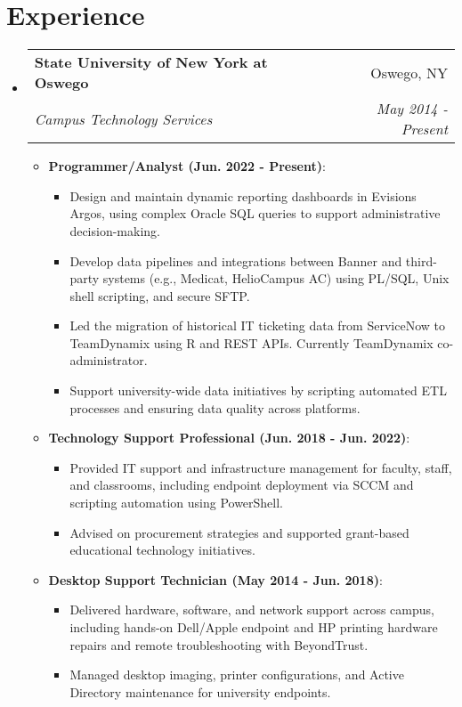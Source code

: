 \documentclass[letterpaper,11pt]{article}
\makeatletter
\newcommand{\resumeItem}[2]{
  \item\small{
    \textbf{#1}{: #2 \vspace{-2pt}}
  }
}
\newcommand{\resumeSubheading}[4]{
  \vspace{-1pt}\item
    \begin{tabular*}{0.97\textwidth}[t]{l@{\extracolsep{\fill}}r}
      \textbf{#1} & #2 \\
      \textit{\small#3} & \textit{\small #4} \\
    \end{tabular*}\vspace{-5pt}
}
\newcommand{\resumeSubHeadingListStart}{\begin{itemize}[leftmargin=*]}
\newcommand{\resumeSubHeadingListEnd}{\end{itemize}}
\newcommand{\resumeItemListStart}{\begin{itemize}}
\newcommand{\resumeItemListEnd}{\end{itemize}\vspace{-5pt}}
\makeatother
\begin{document}
\section{Experience}
  	\resumeSubHeadingListStart
    	\resumeSubheading
      		{State University of New York at Oswego}{Oswego, NY}
      		{Campus Technology Services}{May 2014 - Present}
      		\resumeItemListStart
				\resumeItem{Programmer/Analyst (Jun. 2022 - Present)}{}
				\begin{itemize}
					\item Design and maintain dynamic reporting dashboards in Evisions Argos, using complex Oracle SQL queries to support administrative decision-making.
					\item Develop data pipelines and integrations between Banner and third-party systems (e.g., Medicat, HelioCampus AC) using PL/SQL, Unix shell scripting, and secure SFTP.
					\item Led the migration of historical IT ticketing data from ServiceNow to TeamDynamix using R and REST APIs. Currently TeamDynamix co-administrator.
					\item Support university-wide data initiatives by scripting automated ETL processes and ensuring data quality across platforms.
				\end{itemize}
				\resumeItem{Technology Support Professional (Jun. 2018 - Jun. 2022)}{}
				\begin{itemize}
					\item Provided IT support and infrastructure management for faculty, staff, and classrooms, including endpoint deployment via SCCM and scripting automation using PowerShell.
					\item Advised on procurement strategies and supported grant-based educational technology initiatives.
				\end{itemize}
				\resumeItem{Desktop Support Technician (May 2014 - Jun. 2018)}{}
				\begin{itemize}
					\item Delivered hardware, software, and network support across campus, including hands-on Dell/Apple endpoint and HP printing hardware repairs and remote troubleshooting with BeyondTrust.
					\item Managed desktop imaging, printer configurations, and Active Directory maintenance for university endpoints.
				\end{itemize}
      		\resumeItemListEnd
	\resumeSubHeadingListEnd
	
\end{document}
